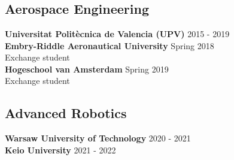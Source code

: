 \section{\faInstitution} \label{sec:education}

\subsection{Aerospace Engineering}

\textbf{Universitat Politècnica de Valencia (UPV)} \hfill 
{\footnotesize 2015 - 2019} \\


\textbf{Embry-Riddle Aeronautical University} \hfill 
{\footnotesize Spring 2018} \\
Exchange student \\


\textbf{Hogeschool van Amsterdam} \hfill 
{\footnotesize Spring 2019} \\
Exchange student \\

\subsection{Advanced Robotics}

\textbf{Warsaw University of Technology} \hfill 
{\footnotesize 2020 - 2021} \\

\textbf{Keio University} \hfill 
{\footnotesize 2021 - 2022} \\